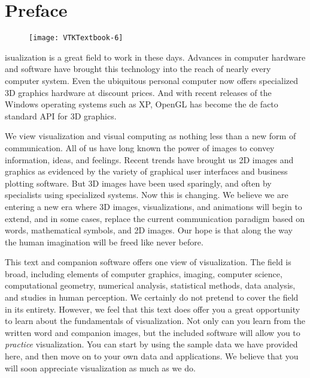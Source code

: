
\chapter*{Preface}
\markright{}

\begin{figure}[ht]
	\hfill
	\begin{minipage}{0.5\textwidth}
		\centering
		\texttt{[image: VTKTextbook-6]}
	\end{minipage}
\end{figure}

\setlength\parindent{24pt}
isualization is a great field to work in these days. Advances in computer hardware and software have brought this technology into the reach of nearly every computer system. Even the ubiquitous personal computer now offers specialized 3D graphics hardware at discount prices. And with recent releases of the Windows operating systems such as XP, OpenGL has become the de facto standard \gls{API} for 3D graphics.

 We view visualization and visual computing as nothing less than a new form of communication. All of us have long known the power of images to convey information, ideas, and feelings. Recent trends have brought us 2D images and graphics as evidenced by the variety of graphical user interfaces and business plotting software. But 3D images have been used sparingly, and often by specialists using specialized systems. Now this is changing. We believe we are entering a new era where 3D images, visualizations, and animations will begin to extend, and in some cases, replace the current communication paradigm based on words, mathematical symbols, and 2D images. Our hope is that along the way the human imagination will be freed like never before.

This text and companion software offers one view of visualization. The field is broad, including elements of computer graphics, imaging, computer science, computational geometry, numerical analysis, statistical methods, data analysis, and studies in human perception. We certainly do not pretend to cover the field in its entirety. However, we feel that this text does offer you a great opportunity to learn about the fundamentals of visualization. Not only can you learn from the written word and companion images, but the included software will allow you to \textit{practice} visualization. You can start by using the sample data we have provided here, and then move on to your own data and applications. We believe that you will soon appreciate visualization as much as we do.

